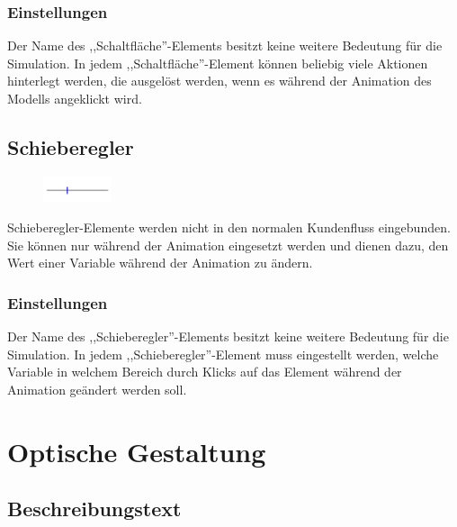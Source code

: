\subsection*{Einstellungen}

Der Name des ,,Schaltfläche''-Elements besitzt keine weitere Bedeutung für die Simulation.
In jedem ,,Schaltfläche''-Element können beliebig viele Aktionen hinterlegt werden, die
ausgelöst werden, wenn es während der Animation des Modells angeklickt wird.


\section{Schieberegler}
\label{ref:ModelElementInteractiveSlider}

\begin{figure}
\vspace{-22pt}
\includegraphics[width=2cm]{imageModelElementInteractiveSlider.png}
\vspace{-22pt}
\end{figure}

Schieberegler-Elemente werden nicht in den normalen Kundenfluss eingebunden.
Sie können nur während der Animation eingesetzt werden und dienen dazu,
den Wert einer Variable während der Animation zu ändern.

\subsection*{Einstellungen}

Der Name des ,,Schieberegler''-Elements besitzt keine weitere Bedeutung für die Simulation.
In jedem ,,Schieberegler''-Element muss eingestellt werden, welche Variable in welchem
Bereich durch Klicks auf das Element während der Animation geändert werden soll.





\chapter{Optische Gestaltung}

\section{Beschreibungstext}
\label{ref:ModelElementText}


